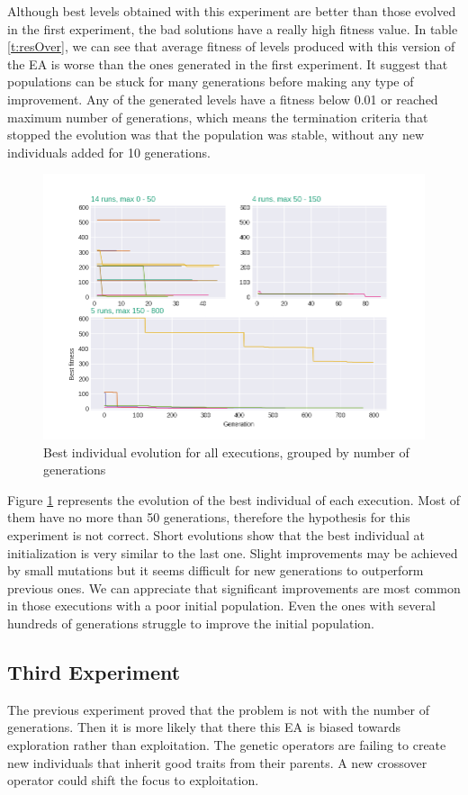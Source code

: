 Although best levels obtained with this experiment are better than those evolved in the first experiment, the bad solutions have a really high fitness value. In table \ref{t:resOver}, we can see that average fitness of levels produced with this version of the EA is worse than the ones generated in the first experiment. It suggest that populations can be stuck for many generations before making any type of improvement. Any of the generated levels have a fitness below 0.01 or reached maximum number of generations, which means the termination criteria that stopped the evolution was that the population was stable, without any new individuals added for 10 generations. 
\begin{figure}[H]
	\centering
	\includegraphics[scale=0.5]{exp2_explication.png}
	\caption{Best individual evolution for all executions, grouped by number of generations}\label{f:grahp2}
\end{figure}
Figure \ref{f:grahp2} represents the evolution of the best individual of each execution. Most of them have no more than 50 generations, therefore the hypothesis for this experiment is not correct. Short evolutions show that the best individual at initialization is very similar to the last one. Slight improvements may be achieved by small mutations but it seems difficult for new generations to outperform previous ones. We can appreciate that significant improvements are most common in those executions with a poor initial population. Even the ones with several hundreds of generations struggle to improve the initial population.

\subsection{Third Experiment}
The previous experiment proved that the problem is not with the number of generations. Then it is more likely that there this EA is biased towards exploration rather than exploitation. The genetic operators are failing to create new individuals that inherit good traits from their parents. A new crossover operator could shift the focus to exploitation.


